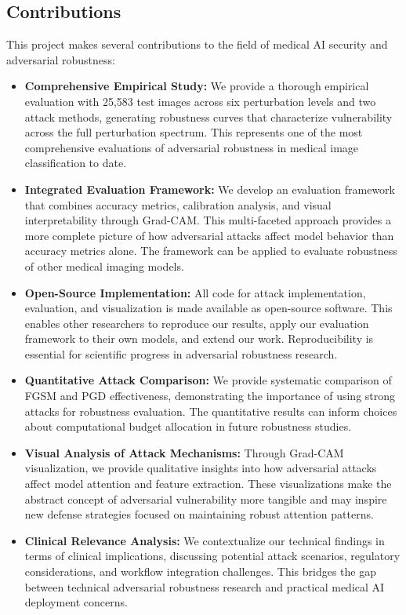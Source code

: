 \documentclass[12pt,a4paper]{article}
\begin{document}
\subsection{Contributions}

This project makes several contributions to the field of medical AI security and adversarial robustness:

\begin{itemize}[leftmargin=*]
    \item \textbf{Comprehensive Empirical Study:} We provide a thorough empirical evaluation with 25,583 test images across six perturbation levels and two attack methods, generating robustness curves that characterize vulnerability across the full perturbation spectrum. This represents one of the most comprehensive evaluations of adversarial robustness in medical image classification to date.
    
    \item \textbf{Integrated Evaluation Framework:} We develop an evaluation framework that combines accuracy metrics, calibration analysis, and visual interpretability through Grad-CAM. This multi-faceted approach provides a more complete picture of how adversarial attacks affect model behavior than accuracy metrics alone. The framework can be applied to evaluate robustness of other medical imaging models.
    
    \item \textbf{Open-Source Implementation:} All code for attack implementation, evaluation, and visualization is made available as open-source software. This enables other researchers to reproduce our results, apply our evaluation framework to their own models, and extend our work. Reproducibility is essential for scientific progress in adversarial robustness research.
    
    \item \textbf{Quantitative Attack Comparison:} We provide systematic comparison of FGSM and PGD effectiveness, demonstrating the importance of using strong attacks for robustness evaluation. The quantitative results can inform choices about computational budget allocation in future robustness studies.
    
    \item \textbf{Visual Analysis of Attack Mechanisms:} Through Grad-CAM visualization, we provide qualitative insights into how adversarial attacks affect model attention and feature extraction. These visualizations make the abstract concept of adversarial vulnerability more tangible and may inspire new defense strategies focused on maintaining robust attention patterns.
    
    \item \textbf{Clinical Relevance Analysis:} We contextualize our technical findings in terms of clinical implications, discussing potential attack scenarios, regulatory considerations, and workflow integration challenges. This bridges the gap between technical adversarial robustness research and practical medical AI deployment concerns.
\end{itemize}
\end{document}

